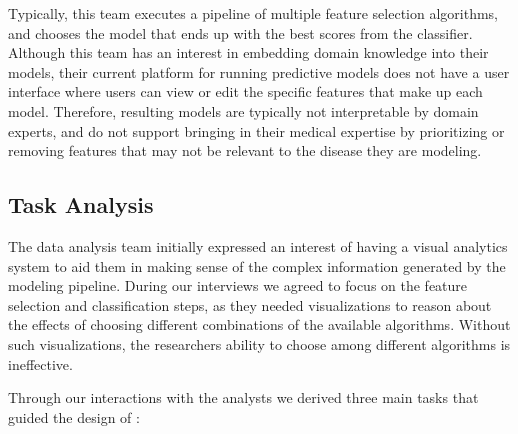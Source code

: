Typically, this team executes a pipeline of multiple feature selection
algorithms, and chooses the model that ends up
with the best scores from the classifier.
Although this team has an interest in embedding domain knowledge
into their models, their current platform for running predictive models
does not have a user interface where users can view or edit the
specific features that make up each model.
Therefore, resulting models are typically not interpretable
by domain experts,
and do not support bringing in their medical expertise by prioritizing or removing features that may not be relevant to the disease they are modeling.

\subsection{Task Analysis}
\label{sec:task-analysis}

The data analysis team initially expressed an interest of having a visual analytics system to aid them in making sense of the complex information generated by the modeling pipeline. During our interviews we agreed to focus on the feature selection and classification steps, as they needed visualizations to reason about the effects of choosing different combinations of the available algorithms. Without such visualizations, the researchers ability to choose among different algorithms is ineffective.

Through our interactions with the analysts we derived three main tasks that guided the design of \infuse:


